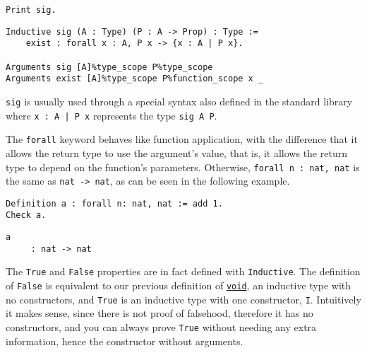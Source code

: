 \begin{verbatim}
Print sig.
\end{verbatim}
\vspace{-\baselineskip*3/2}
\begin{verbatim}
Inductive sig (A : Type) (P : A -> Prop) : Type :=
    exist : forall x : A, P x -> {x : A | P x}.

Arguments sig [A]%type_scope P%type_scope
Arguments exist [A]%type_scope P%function_scope x _
\end{verbatim}
\noindent \texttt{sig} is usually used through a special syntax also defined in the standard library
where \texttt{{x : A | P x}} represents the type \texttt{sig A P}.

The \texttt{forall} keyword behaves like function application, with the difference that it
allows the return type to use the argument's value, that is, it allows the return type to depend on
the  function's parameters. Otherwise, \texttt{forall n : nat, nat} is the same as
\texttt{nat -> nat}, as can be seen in the following example.

\begin{verbatim}
Definition a : forall n: nat, nat := add 1.
Check a.
\end{verbatim}
\vspace{-\baselineskip*3/2}
\begin{verbatim}
a
     : nat -> nat
\end{verbatim}

The \texttt{True} and \texttt{False} properties are in fact defined with \texttt{Inductive}. The definition of \texttt{False} is equivalent to our previous definition of 
\hyperref[lst:void]{\texttt{void}}, an inductive type with no constructors, and 
\texttt{True} is an inductive type with one constructor, \texttt{I}. Intuitively it 
makes sense, since there is not proof of falsehood, therefore it has no constructors, and you can always
prove \texttt{True} without needing any extra information, hence the constructor without 
arguments.


